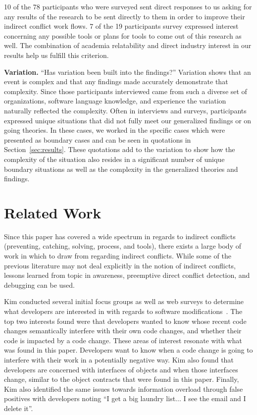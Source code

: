 \documentclass[conference]{IEEEtran}
\begin{document}
10 of the 78 participants who were surveyed sent direct responses to us asking for any results of the research to be sent directly to
them in order to improve their indirect conflict work flows. 7 of the 19 participants survey expressed interest concerning any possible
tools or plans for tools to come out of this research as well. The combination of academia relatability and direct industry interest 
in our results help us fulfill this criterion.

{\bfseries Variation.} ``Has variation been built into the findings?'' Variation shows that an event is complex and that any findings
made accurately demonstrate that complexity. Since those participants interviewed came from such a diverse set of organizations, 
software language knowledge, and experience the variation naturally reflected the complexity. Often in interviews and surveys, participants
expressed unique situations that did not fully meet our generalized findings or on going theories. In these cases, we worked in the specific
cases which were presented as boundary cases and can be seen in quotations in Section~\ref{sec:results}. These quotations add to the variation
to show how the complexity of the situation also resides in a significant number of unique boundary situations as well as the complexity
in the generalized theories and findings.

\section{Related Work}
\label{sec:related}

Since this paper has covered a wide spectrum in regards to indirect conflicts (preventing, catching, solving, process, and tools), there
exists a large body of work in which to draw from regarding indirect conflicts. While some of the previous literature may not deal explicitly
in the notion of indirect conflicts, lessons learned from topic in awareness, preemptive direct conflict detection, and debugging can be used.

Kim conducted several initial focus groups as well as web surveys to determine what developers are interested in with regards to software
modifications~\cite{Kim:2011:ESA}. The top two interests found were that developers wanted to know whose recent code changes semantically
interfere with their own code changes, and whether their code is impacted by a code change. These areas of interest resonate with what was
found in this paper. Developers want to know when a code change is going to interfere with their work in a potentially negative way.  Kim
also found that developers are concerned with interfaces of objects and when those interfaces change, similar to the object contracts that
were found in this paper. Finally, Kim also identified the same issues towards information overload through false positives with developers
noting ``I get a big laundry list... I see the email and I delete it''.
\end{document}
